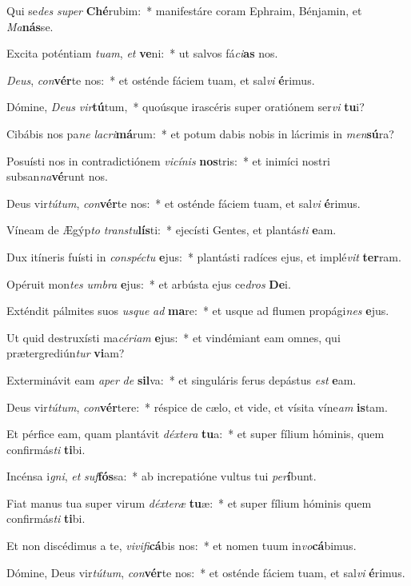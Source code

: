 \item Qui se\textit{des} \textit{su}\textit{per} \textbf{Ché}rubim:~* manifestáre coram Ephraim, Bénjamin, et \textit{Ma}\textbf{nás}se.
\item Excita poténtiam \textit{tu}\textit{am}, \textit{et} \textbf{ve}ni:~* ut salvos fá\textit{ci}\textbf{as} nos.
\item \textit{De}\textit{us}, \textit{con}\textbf{vér}te nos:~* et osténde fáciem tuam, et sal\textit{vi} \textbf{é}rimus.
\item Dómine, \textit{De}\textit{us} \textit{vir}\textbf{tú}tum,~* quoúsque irascéris super oratiónem ser\textit{vi} \textbf{tu}i?
\item Cibábis nos pa\textit{ne} \textit{la}\textit{cri}\textbf{má}rum:~* et potum dabis nobis in lácrimis in \textit{men}\textbf{sú}ra?
\item Posuísti nos in contradictiónem \textit{vi}\textit{cí}\textit{nis} \textbf{nos}tris:~* et inimíci nostri subsan\textit{na}\textbf{vé}runt nos.
\item Deus vir\textit{tú}\textit{tum}, \textit{con}\textbf{vér}te nos:~* et osténde fáciem tuam, et sal\textit{vi} \textbf{é}rimus.
\item Víneam de Ægýp\textit{to} \textit{trans}\textit{tu}\textbf{lís}ti:~* ejecísti Gentes, et plantás\textit{ti} \textbf{e}am.
\item Dux itíneris fuísti in \textit{con}\textit{spéc}\textit{tu} \textbf{e}jus:~* plantásti radíces ejus, et implé\textit{vit} \textbf{ter}ram.
\item Opéruit mon\textit{tes} \textit{um}\textit{bra} \textbf{e}jus:~* et arbústa ejus ce\textit{dros} \textbf{De}i.
\item Exténdit pálmites suos \textit{us}\textit{que} \textit{ad} \textbf{ma}re:~* et usque ad flumen propági\textit{nes} \textbf{e}jus.
\item Ut quid destruxísti ma\textit{cé}\textit{ri}\textit{am} \textbf{e}jus:~* et vindémiant eam omnes, qui prætergrediún\textit{tur} \textbf{vi}am?
\item Exterminávit eam \textit{a}\textit{per} \textit{de} \textbf{sil}va:~* et singuláris ferus depástus \textit{est} \textbf{e}am.
\item Deus vir\textit{tú}\textit{tum}, \textit{con}\textbf{vér}tere:~* réspice de cælo, et vide, et vísita víne\textit{am} \textbf{is}tam.
\item Et pérfice eam, quam plantávit \textit{déx}\textit{te}\textit{ra} \textbf{tu}a:~* et super fílium hóminis, quem confirmás\textit{ti} \textbf{ti}bi.
\item Incénsa i\textit{gni}, \textit{et} \textit{suf}\textbf{fós}sa:~* ab increpatióne vultus tui \textit{per}\textbf{í}bunt.
\item Fiat manus tua super virum \textit{déx}\textit{te}\textit{ræ} \textbf{tu}æ:~* et super fílium hóminis quem confirmás\textit{ti} \textbf{ti}bi.
\item Et non discédimus a te, \textit{vi}\textit{vi}\textit{fi}\textbf{cá}bis nos:~* et nomen tuum in\textit{vo}\textbf{cá}bimus.
\item Dómine, Deus vir\textit{tú}\textit{tum}, \textit{con}\textbf{vér}te nos:~* et osténde fáciem tuam, et sal\textit{vi} \textbf{é}rimus.
